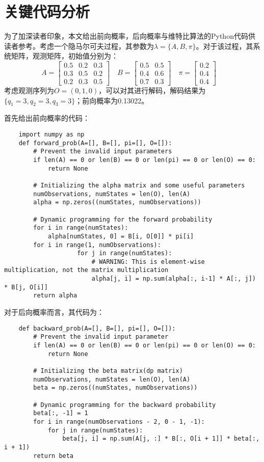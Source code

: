 \documentclass[UTF8, 12pt]{ctexart}
\begin{document}
\section{关键代码分析}
	为了加深读者印象，本文给出前向概率，后向概率与维特比算法的Python代码供读者参考。考虑一个隐马尔可夫过程，其参数为$\lambda = \{A, B, \pi\}$。对于该过程，其系统矩阵，观测矩阵，初始值分别为：
	\begin{equation}
	A = \begin{bmatrix}
		0.5 & 0.2 & 0.3 \\
		0.3 & 0.5 & 0.2 \\
		0.2 & 0.3 & 0.5
		\end{bmatrix}\quad
	B = \begin{bmatrix}
		0.5 & 0.5 \\
		0.4 & 0.6 \\
		0.7 & 0.3
		\end{bmatrix} \quad
	\pi = \begin{bmatrix}
			0.2 \\
			0.4 \\
			0.4
		  \end{bmatrix} \quad
	\end{equation}
	考虑观测序列为$O = (0, 1, 0)$，可以对其进行解码，解码结果为$\{q_{1}=3, q_{2}=3, q_{3}=3\}$；前向概率为0.13022。
	
	首先给出前向概率的代码：
	\begin{lstlisting}
	import numpy as np
	def forward_prob(A=[], B=[], pi=[], O=[]):
		# Prevent the invalid input parameters
		if len(A) == 0 or len(B) == 0 or len(pi) == 0 or len(O) == 0:
			return None
	
		# Initializing the alpha matrix and some useful parameters
		numObservations, numStates = len(O), len(A)
		alpha = np.zeros((numStates, numObservations))
		
		# Dynamic programming for the forward probability
		for i in range(numStates):
			alpha[numStates, 0] = B[i, O[0]] * pi[i]
		for i in range(1, numObservations):
					for j in range(numStates):
						# WARNING: This is element-wise multiplication, not the matrix multiplication
						alpha[j, i] = np.sum(alpha[:, i-1] * A[:, j]) * B[j, O[i]]
		return alpha
	\end{lstlisting}
	
	对于后向概率而言，其代码为：
	\begin{lstlisting}
	def backward_prob(A=[], B=[], pi=[], O=[]):
		# Prevent the invalid input parameter
		if len(A) == 0 or len(B) == 0 or len(pi) == 0 or len(O) == 0:
			return None    
	
		# Initializing the beta matrix(dp matrix)
		numObservations, numStates = len(O), len(A)
		beta = np.zeros((numStates, numObservations))
	
		# Dynamic programming for the backward probability
		beta[:, -1] = 1
		for i in range(numObservations - 2, 0 - 1, -1):
			for j in range(numStates):
				beta[j, i] = np.sum(A[j, :] * B[:, O[i + 1]] * beta[:, i + 1])
		return beta
	\end{lstlisting}
	
\end{document}

